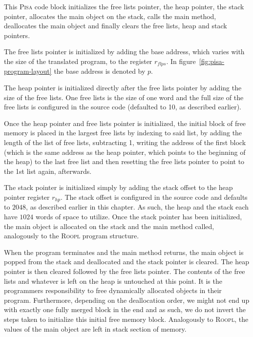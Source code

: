 This \textsc{Pisa} code block initializes the free lists pointer, the heap pointer, the stack pointer, allocates the main object on the stack, calls the main method, deallocates the main object and finally clears the free lists, heap and stack pointers.

The free lists pointer is initialized by adding the base address, which varies with the size of the translated program, to the register $r_{flps}$. In figure~\ref{fig:pisa-program-layout} the base address is denoted by $p$.

The heap pointer is initialized directly after the free lists pointer by adding the size of the free lists. One free lists is the size of one word and the full size of the free lists is configured in the source code (defaulted to 10, as described earlier).

Once the heap pointer and free lists pointer is initialized, the initial block of free memory is placed in the largest free lists by indexing to said list, by adding the length of the list of free lists, subtracting 1, writing the address of the first block (which is the same address as the heap pointer, which points to the beginning of the heap) to the last free list and then resetting the free lists pointer to point to the 1st list again, afterwards.

The stack pointer is initialized simply by adding the stack offset to the heap pointer register $r_{hp}$. The stack offset is configured in the source code and defaults to $2048$, as described earlier in this chapter. As such, the heap and the stack each have $1024$ words of space to utilize. Once the stack pointer has been initialized, the main object is allocated on the stack and the main method called, analogously to the \textsc{Roopl} program structure.

When the program terminates and the main method returns, the main object is popped from the stack and deallocated and the stack pointer is cleared. The heap pointer is then cleared followed by the free lists pointer. The contents of the free lists and whatever is left on the heap is untouched at this point. It is the programmers responsibility to free dynamically allocated objects in their \rooplpp program. Furthermore, depending on the deallocation order, we might not end up with exactly one fully merged block in the end and as such, we do not invert the steps taken to initialize this initial free memory block.
Analogously to \textsc{Roopl}, the values of the main object are left in stack section of memory.



